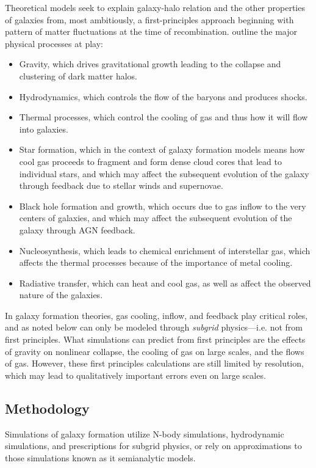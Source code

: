 Theoretical models seek to explain galaxy-halo relation and the other
properties of galaxies from, most ambitiously, a first-principles
approach beginning with pattern of matter fluctuations at the time of
recombination. \citet{somerville15a} outline the major physical
processes at play:
\begin{itemize}
  \item Gravity, which drives gravitational growth leading to the
    collapse and clustering of dark matter halos. 
  \item Hydrodynamics, which controls the flow of the baryons and
    produces shocks. 
  \item Thermal processes, which control the cooling of gas and thus
    how it will flow into galaxies.
  \item Star formation, which in the context of galaxy formation
    models means how cool gas proceeds to fragment and form dense
    cloud cores that lead to individual stars, and which may affect
    the subsequent evolution of the galaxy through feedback due to
    stellar winds and supernovae.
  \item Black hole formation and growth, which occurs due to gas
    inflow to the very centers of galaxies, and which may affect the
    subsequent evolution of the galaxy through AGN feedback.
  \item Nucleosynthesis, which leads to chemical enrichment of
    interstellar gas, which affects the thermal processes because of
    the importance of metal cooling.
  \item Radiative transfer, which can heat and cool gas, as well as
    affect the observed nature of the galaxies.
\end{itemize}

In galaxy formation theories, gas cooling, inflow, and feedback play
critical roles, and as noted below can only be modeled through {\it
subgrid} physics---i.e. not from first principles. What simulations
can predict from first principles are the effects of gravity on
nonlinear collapse, the cooling of gas on large scales, and the flows
of gas.  However, these first principles calculations are still
limited by resolution, which may lead to qualitatively important
errors even on large scales.

\subsection{Methodology}

Simulations of galaxy formation utilize N-body simulations,
hydrodynamic simulations, and prescriptions for subgrid
physics, or rely on approximations to those simulations known as {it
semianalytic models}.

